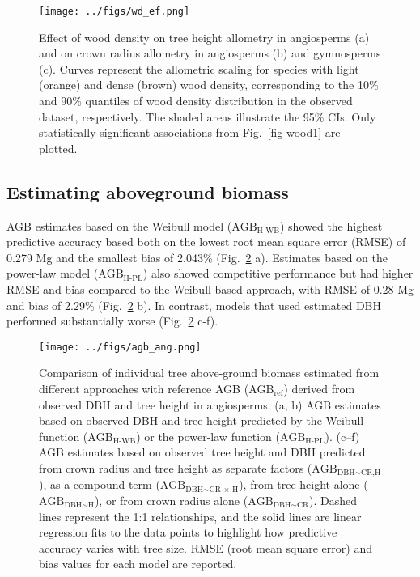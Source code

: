 \documentclass[
  12pt,
  letterpaper,
  DIV=11,
  numbers=noendperiod]{scrartcl}
\begin{document}
\begin{figure}[H]

{\centering \texttt{[image: ../figs/wd\_ef.png]}

}

\caption{\label{fig-wood2}Effect of wood density on tree height
allometry in angiosperms (a) and on crown radius allometry in
angiosperms (b) and gymnosperms (c). Curves represent the allometric
scaling for species with light (orange) and dense (brown) wood density,
corresponding to the 10\% and 90\% quantiles of wood density
distribution in the observed dataset, respectively. The shaded areas
illustrate the 95\% CIs. Only statistically significant associations
from Fig.~\ref{fig-wood1} are plotted.}

\end{figure}

\hypertarget{estimating-aboveground-biomass}{%
\subsection{Estimating aboveground
biomass}\label{estimating-aboveground-biomass}}

AGB estimates based on the Weibull model (\(\text{AGB}_\text{H-WB}\))
showed the highest predictive accuracy based both on the lowest root
mean square error (RMSE) of 0.279 Mg and the smallest bias of 2.043\%
(Fig.~\ref{fig-agb} a). Estimates based on the power-law model
(\(\text{AGB}_\text{H-PL}\)) also showed competitive performance but had
higher RMSE and bias compared to the Weibull-based approach, with RMSE
of 0.28 Mg and bias of 2.29\% (Fig.~\ref{fig-agb} b). In contrast,
models that used estimated DBH performed substantially worse
(Fig.~\ref{fig-agb} c-f).

\begin{figure}[H]

{\centering \texttt{[image: ../figs/agb\_ang.png]}

}

\caption{\label{fig-agb}Comparison of individual tree above-ground
biomass estimated from different approaches with reference AGB
(\(\text{AGB}_\text{ref}\)) derived from observed DBH and tree height in
angiosperms. (a, b) AGB estimates based on observed DBH and tree height
predicted by the Weibull function (\(\text{AGB}_\text{H-WB}\)) or the
power-law function (\(\text{AGB}_\text{H-PL}\)). (c--f) AGB estimates
based on observed tree height and DBH predicted from crown radius and
tree height as separate factors
(\(\text{AGB}_{\text{DBH} \sim \text{CR,H}}\)), as a compound term
(\(\text{AGB}_{\text{DBH} \sim \text{CR × H}}\)), from tree height alone
(\(\text{AGB}_{\text{DBH} \sim \text{H}}\)), or from crown radius alone
(\(\text{AGB}_{\text{DBH} \sim \text{CR}}\)). Dashed lines represent the
1:1 relationships, and the solid lines are linear regression fits to the
data points to highlight how predictive accuracy varies with tree size.
RMSE (root mean square error) and bias values for each model are
reported.}

\end{figure}
\end{document}
